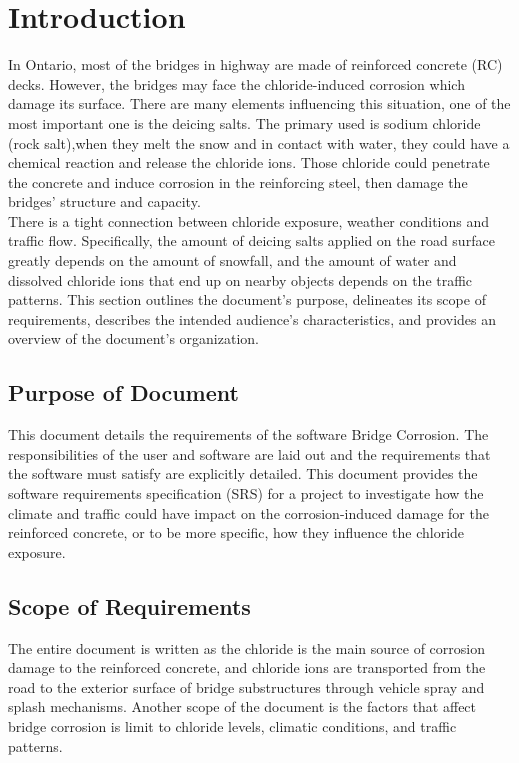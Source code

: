 \documentclass[12pt]{article}
\begin{document}
\newpage


\section{Introduction}
In Ontario, most of the bridges in highway are made of reinforced concrete (RC) decks. However, the bridges may face the chloride-induced corrosion which damage its surface. There are many elements influencing this situation, one of the most important one is the deicing salts. The primary used is sodium chloride (rock salt),when they melt the snow and in contact with water, they could have a chemical reaction and release the chloride ions. Those chloride could penetrate the concrete and induce corrosion in the reinforcing steel, then damage the bridges’ structure and capacity. \\
There is a tight connection between chloride exposure, weather conditions and traffic flow. Specifically, the amount of deicing salts applied on the road surface greatly depends on the amount of snowfall, and the amount of water and dissolved chloride ions that end up on nearby objects depends on the traffic patterns. This section outlines the document's purpose, delineates its scope of requirements, describes the intended audience's characteristics, and provides an overview of the document's organization.

\subsection{Purpose of Document}
This document details the requirements of the software Bridge Corrosion. The
responsibilities of the user and software are laid out and the requirements that the software must satisfy are explicitly detailed. This document provides the software requirements specification (SRS) for a project to investigate how the climate and traffic could have impact on the corrosion-induced damage for the reinforced concrete, or to be more specific, how they influence the chloride exposure. 

\subsection{Scope of Requirements} 
The entire document is written as the chloride is the main source of corrosion damage to the reinforced concrete, and chloride ions are transported from the road to the exterior surface of bridge substructures through vehicle spray and splash mechanisms. Another scope of the document is the factors that affect bridge corrosion is limit to chloride levels, climatic conditions, and traffic patterns.
\end{document}
